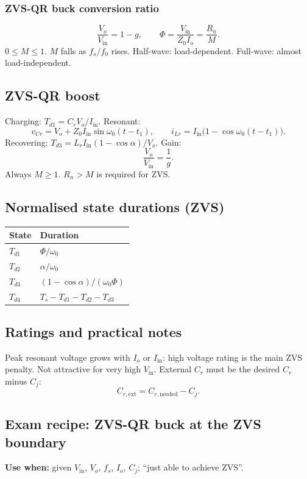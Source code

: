 \subsubsection{ZVS-QR buck conversion ratio}
\[
\frac{V_o}{V_{\mathrm{in}}}=1-g,\qquad
\Phi=\frac{V_{\mathrm{in}}}{Z_0 I_o}=\frac{R_n}{M}.
\]
\(0\le M\le 1\). \(M\) falls as \(f_s/f_0\) rises. Half-wave: load-dependent. Full-wave: almost load-independent.

\subsection{ZVS-QR boost}
Charging: \(T_{d1}=C_r V_o/I_{\mathrm{in}}\). Resonant:
\[
v_{Cr}=V_o+Z_0 I_{\mathrm{in}}\sin\omega_0(t-t_1),\qquad
i_{Lr}=I_{\mathrm{in}}\bigl(1-\cos\omega_0(t-t_1)\bigr).
\]
Recovering: \(T_{d3}=L_r I_{\mathrm{in}}(1-\cos\alpha)/V_o\). Gain:
\[
\frac{V_o}{V_{\mathrm{in}}}=\frac{1}{g}.
\]
Always \(M\ge 1\). \(R_n>M\) is required for ZVS.

\subsection{Normalised state durations (ZVS)}
\begin{center}
\begin{tabular}{@{}ll@{}}
\toprule
State & Duration\\
\midrule
\(T_{d1}\) & \(\Phi/\omega_0\)\\
\(T_{d2}\) & \(\alpha/\omega_0\)\\
\(T_{d3}\) & \((1-\cos\alpha)/(\omega_0\Phi)\)\\
\(T_{d4}\) & \(T_s-T_{d1}-T_{d2}-T_{d3}\)\\
\bottomrule
\end{tabular}
\end{center}

\subsection{Ratings and practical notes}
Peak resonant voltage grows with \(I_o\) or \(I_{\mathrm{in}}\): high voltage rating is the main ZVS penalty. Not attractive for very high \(V_{\mathrm{in}}\). External \(C_r\) must be the desired \(C_r\) minus \(C_j\):
\[
C_{r,\mathrm{ext}}=C_{r,\mathrm{needed}}-C_j.
\]

\subsection{Exam recipe: ZVS-QR buck at the ZVS boundary}
\textbf{Use when:} given \(V_{\mathrm{in}}\), \(V_o\), \(f_s\), \(I_o\), \(C_j\); ``just able to achieve ZVS''.

